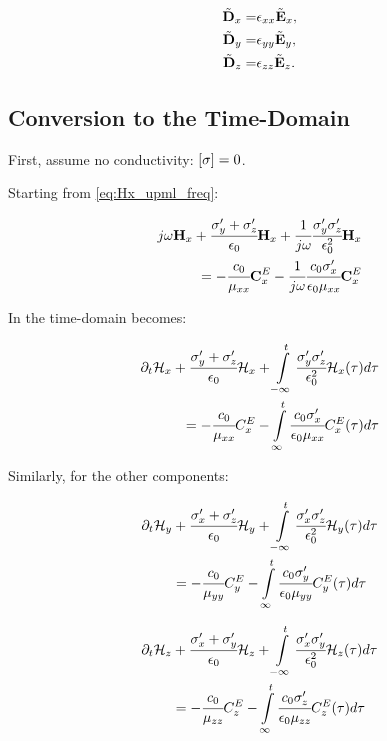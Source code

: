 \begin{small}
    \begin{align}
        \tilde{\textbf{D}}_x =& \epsilon_{xx} \tilde{\textbf{E}}_x, \\
        \tilde{\textbf{D}}_y =& \epsilon_{yy} \tilde{\textbf{E}}_y, \\
        \tilde{\textbf{D}}_z =& \epsilon_{zz} \tilde{\textbf{E}}_z. 
    \end{align}

\end{small}

\subsection{Conversion to the Time-Domain}
First, assume no conductivity: $\brackets{\sigma} = 0$.

Starting from \eqref{eq:Hx_upml_freq}:


\begin{align}
    j\omega \textbf{H}_x + \cfrac{\sigma_y^{\prime} + \sigma_z^{\prime}}{\epsilon_0}\textbf{H}_x + \cfrac{1}{j\omega}\cfrac{\sigma_y^{\prime}\sigma_z^{\prime}}{\epsilon_0^2}\textbf{H}_x \nonumber \\
    = -\cfrac{c_0}{\mu_{xx}}\textbf{C}_x^E - \cfrac{1}{j\omega}\cfrac{c_0\sigma_x^{\prime}}{\epsilon_0\mu_{xx}}\textbf{C}_x^E
\end{align}

In the time-domain becomes:

\begin{align}
    \partial_t\mathcal{H}_x + \cfrac{\sigma_y^{\prime} + \sigma_z^{\prime}}{\epsilon_0}\mathcal{H}_x + \int\limits_{-\infty}^t\cfrac{\sigma_y^{\prime}\sigma_z^{\prime}}{\epsilon_0^2}\mathcal{H}_x(\tau)d\tau \nonumber \\
    = -\cfrac{c_0}{\mu_{xx}}C_x^E - \int\limits_{\infty}^t\cfrac{c_0\sigma_x^{\prime}}{\epsilon_0\mu_{xx}}C_x^E(\tau)d\tau
    \label{eq:Hx_upml_time}
\end{align}

Similarly, for the other components:

\begin{align}
    \partial_t\mathcal{H}_y &+ \cfrac{\sigma_x^{\prime} + \sigma_z^{\prime}}{\epsilon_0}\mathcal{H}_y + \int\limits_{-\infty}^t\cfrac{\sigma_x^{\prime}\sigma_z^{\prime}}{\epsilon_0^2}\mathcal{H}_y(\tau)d\tau \nonumber \\
    &= -\cfrac{c_0}{\mu_{yy}}C_y^E - \int\limits_{\infty}^t\cfrac{c_0\sigma_y^{\prime}}{\epsilon_0\mu_{yy}}C_y^E(\tau)d\tau
    \label{eq:Hy_upml_time}
\end{align}

\begin{align}
    \partial_t\mathcal{H}_z
    &+
    \cfrac{\sigma_x^{\prime} + \sigma_y^{\prime}}{\epsilon_0}\mathcal{H}_z
    +
    \int\limits_{-\infty}^t\cfrac{\sigma_x^{\prime}\sigma_y^{\prime}}{\epsilon_0^2}\mathcal{H}_z(\tau)d\tau \nonumber \\
    &= 
    -\cfrac{c_0}{\mu_{zz}}C_z^E
    -\int\limits_{\infty}^t\cfrac{c_0\sigma_z^{\prime}}{\epsilon_0\mu_{zz}}C_z^E(\tau)d\tau
    \label{eq:Hz_upml_time}
\end{align}

